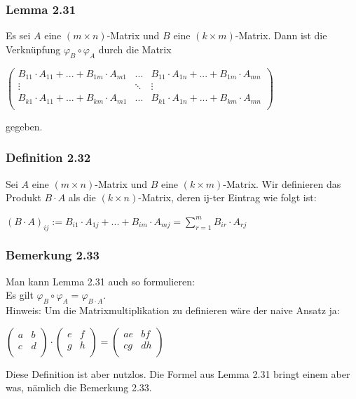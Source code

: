 \documentclass{article}
\begin{document}
\subsubsection*{Lemma 2.31}
Es sei $A$ eine $(m \times n)$-Matrix und $B$ eine $(k \times m)$-Matrix. Dann ist die Verknüpfung $\varphi_B \circ \varphi_A$ durch die Matrix \\
\begin{center}
    $\begin{pmatrix}
        B_{11} \cdot A_{11} + ... + B_{1m} \cdot A_{m1} & ... & B_{11} \cdot A_{1n} + ... + B_{1m} \cdot A_{mn} \\
        \vdots & \ddots & \vdots \\
        B_{k1} \cdot A_{11} + ... + B_{km} \cdot A_{m1} & ... & B_{k1} \cdot A_{1n} + ... + B_{km} \cdot A_{mn} \\
    \end{pmatrix}$
\end{center}
gegeben. 
\\
\subsubsection*{Definition 2.32}
Sei $A$ eine $(m \times n)$-Matrix und $B$ eine $(k \times m)$-Matrix. Wir definieren das Produkt $B \cdot A$ als die $(k \times n)$-Matrix, deren ij-ter Eintrag wie folgt ist: \\
\begin{center}
    $(B \cdot A)_{ij} := B_{i1} \cdot A_{1j} + ... + B_{im} \cdot A_{mj} = \displaystyle\sum_{r=1}^m B_{ir} \cdot A_{rj}$ \\
\end{center}

\subsubsection*{Bemerkung 2.33}
Man kann Lemma 2.31 auch so formulieren: \\
Es gilt $\varphi_B \circ \varphi_A = \varphi_{B \cdot A}$. \\
Hinweis: 
Um die Matrixmultiplikation zu definieren wäre der naive Ansatz ja: 
\begin{center}
    $\begin{pmatrix}
        a & b \\
        c & d \\
    \end{pmatrix} \cdot \begin{pmatrix}
        e & f \\
        g & h \\
    \end{pmatrix} = \begin{pmatrix}
        ae & bf \\
        cg & dh \\
    \end{pmatrix}$
\end{center}
Diese Definition ist aber nutzlos. Die Formel aus Lemma 2.31 bringt einem aber was, nämlich die Bemerkung 2.33. 
\\
\end{document}
